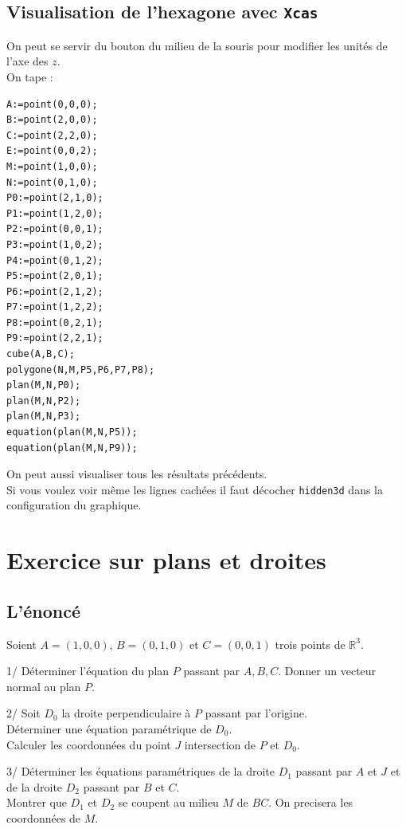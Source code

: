 \documentclass[a4paper,11pt]{book}
\begin{document}
\subsection{Visualisation de l'hexagone avec {\tt Xcas}}
On peut se servir du bouton du milieu de la souris pour modifier les unit\'es 
de l'axe des $z$.\\
On tape :
\begin{verbatim}
A:=point(0,0,0);
B:=point(2,0,0);
C:=point(2,2,0);
E:=point(0,0,2);
M:=point(1,0,0);
N:=point(0,1,0);
P0:=point(2,1,0);
P1:=point(1,2,0);
P2:=point(0,0,1);
P3:=point(1,0,2);
P4:=point(0,1,2);
P5:=point(2,0,1);
P6:=point(2,1,2);
P7:=point(1,2,2);
P8:=point(0,2,1);
P9:=point(2,2,1);
cube(A,B,C);
polygone(N,M,P5,P6,P7,P8);
plan(M,N,P0);
plan(M,N,P2);
plan(M,N,P3);
equation(plan(M,N,P5));
equation(plan(M,N,P9));
\end{verbatim}
On peut aussi visualiser tous les r\'esultats pr\'ec\'edents.\\
Si vous voulez voir m\^eme les lignes cach\'ees il faut d\'ecocher
{\tt hidden3d} dans la configuration du graphique.
\section{Exercice sur plans et droites}
\subsection{L'\'enonc\'e}
Soient $A=(1,0,0)$, $B=(0,1,0)$ et $C=(0,0,1)$ trois points de $\mathbb R^3$.

1/ D\'eterminer l'\'equation du plan $P$ passant par $A,B,C$.
Donner un vecteur normal au plan $P$.

2/ Soit $D_0$ la droite perpendiculaire \`a $P$ passant par l'origine.\\
D\'eterminer une \'equation param\'etrique de $D_0$.\\
Calculer les coordonn\'ees du point $J$ intersection de $P$ et $D_0$.

3/ D\'eterminer les \'equations param\'etriques de la droite $D_1$ passant par 
$A$ et $J$ et de la droite $D_2$ passant par $B$ et $C$.\\
Montrer que  $D_1$ et $D_2$ se coupent au milieu $M$ de $BC$. On precisera les 
coordonn\'ees de $M$.
\end{document}
